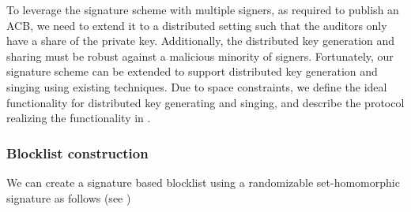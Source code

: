 %
To leverage the signature scheme with multiple signers, as required to publish an ACB, we need to extend it to a distributed setting such that the auditors only have a share of the private key. Additionally, the distributed key generation and sharing must be robust against a malicious minority of signers. Fortunately, our signature scheme can be extended to support distributed key generation and singing using existing techniques. Due to space constraints, we define the ideal functionality \distSigningFunc for distributed key generating and singing, and describe the protocol realizing the functionality in . 




\subsubsection{Blocklist construction}
%
We can create a signature based blocklist using a randomizable set-homomorphic signature as follows (see \figref{})

